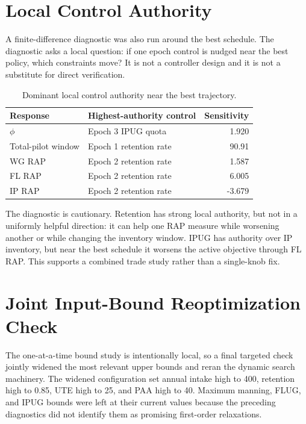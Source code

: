 \documentclass[10pt]{article}
\begin{document}
\section{Local Control Authority}

A finite-difference diagnostic was also run around the best schedule. The
diagnostic asks a local question: if one epoch control is nudged near the best
policy, which constraints move? It is not a controller design and it is not a
substitute for direct verification.

\begin{table}[htbp]
\centering
\caption{Dominant local control authority near the best trajectory.}
\label{tab:authority}
\begin{tabular}{llr}
\toprule
Response & Highest-authority control & Sensitivity \\
\midrule
$\phi$ & Epoch 3 IPUG quota & 1.920 \\
Total-pilot window & Epoch 1 retention rate & 90.91 \\
WG RAP & Epoch 2 retention rate & 1.587 \\
FL RAP & Epoch 2 retention rate & 6.005 \\
IP RAP & Epoch 2 retention rate & -3.679 \\
\bottomrule
\end{tabular}
\end{table}

The diagnostic is cautionary. Retention has strong local authority, but not in
a uniformly helpful direction: it can help one RAP measure while worsening
another or while changing the inventory window. IPUG has authority over IP
inventory, but near the best schedule it worsens the active objective through
FL RAP. This supports a combined trade study rather than a single-knob fix.

\section{Joint Input-Bound Reoptimization Check}

The one-at-a-time bound study is intentionally local, so a final targeted check
jointly widened the most relevant upper bounds and reran the dynamic search
machinery. The widened configuration set annual intake high to 400, retention
high to 0.85, UTE high to 25, and PAA high to 40. Maximum manning, FLUG, and
IPUG bounds were left at their current values because the preceding diagnostics
did not identify them as promising first-order relaxations.
\end{document}
